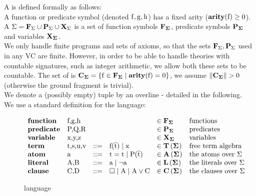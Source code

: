 A  is defined formally as follows:\\
A function or predicate symbol (denoted $\mathrm{f},\mathrm{g},\mathrm{h}$) has a fixed arity ($\mathbf{arity}(\mathrm{f})\geq 0$).\\
A  $\mathrm{\Sigma=\mathbf{F}_{\mathrm{\Sigma}} \cup \mathbf{P}_{\mathrm{\Sigma}} \cup \mathbf{X}_{\mathrm{\Sigma}}}$
is a set of function symbols $\Fs{\sig}$, predicate symbols $\Ps{\sig}$ and variables $\Vs{\sig}$.\\
We only handle finite programs and sets of axioms, so that the sets $\mathbf{F}_{\mathrm{\Sigma}},\mathbf{P}_{\mathrm{\Sigma}}$ used in any VC are finite. 
However, in order to be able to handle theories with countable signatures, such as integer arithmetic, we allow both these sets to be countable.
The set of  is $\m{\consts{}=\s{\func{f} \in \funcs{} \mid \arity{f}=0 }}$, we assume $\|\consts{}\|>0$ (otherwise the ground fragment is trivial).\\
We denote a (possibly empty) tuple by an overline - detailed in the following.\\
We use a standard definition for the language:
\begin{figure}[H]
$
\begin{array}{llllll}
	\mathbf{function}  & \mbox{f,g,h}   &     &                                       & \in \Fs{\sig} & \textrm{functions}\\
	\mathbf{predicate} & \mbox{P,Q,R}   &     &                                       & \in \Ps{\sig} & \textrm{predicates}\\
	\mathbf{variable}  & \mbox{x,y,z}   &     &                                       & \in \Vs{\sig} & \textrm{variables}\\
	\mathbf{term}      & \mbox{t,s,u,v} & ::= & \m{\fa{f}{t} \mid x}                  & \in \Ts{\sig} & \textrm{free term algebra }\\
	\mathbf{atom}      & \mbox{a}       & ::= & \m{t = t \mid \fa{P}{t}}              & \in \As{\sig} & \textrm{the atoms over } \Sigma\\
	\mathbf{literal}   & \mbox{A,B}     & ::= & \mbox{a} \mid \lnot \mbox{a}          & \in \Ls{\sig} & \textrm{the literals over } \Sigma\\
	\mathbf{clause}    & \mbox{C,D}     & ::= & \m{\emptyClause \mid A \mid A \lor C} & \in \Cs{\sig} & \textrm{the clauses over } \Sigma\\
\end{array}
$
\caption{language}
\end{figure}

